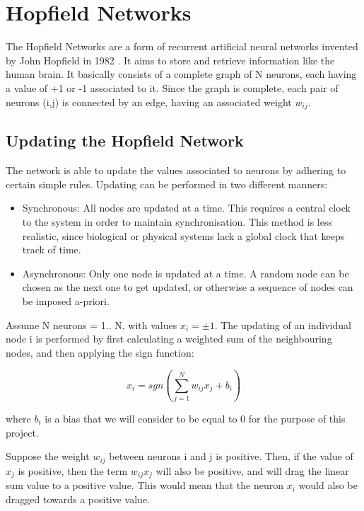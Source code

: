 \section{Hopfield Networks}

The Hopfield Networks are a form of recurrent artificial neural networks invented by John Hopfield in 1982 \cite{hopfield_wiki}. It aims to store and retrieve information like the human brain. It basically consists of a complete graph of N neurons, each having a value of +1 or -1 associated to it. Since the graph is complete, each pair of neurons (i,j) is connected by an edge, having an associated weight \( w_{ij}\).

\subsection{Updating the Hopfield Network}

The network is able to update the values associated to neurons by adhering to certain simple rules. Updating can be performed in two different manners:
\begin{itemize}
 \item Synchronous: All nodes are updated at a time. This requires a central clock to the system in order to maintain synchronisation. This method is less realistic, since biological or physical systems lack a global clock that keeps track of time.
 \item Asynchronous: Only one node is updated at a time. A random node can be chosen as the next one to get updated, or otherwise a sequence of nodes can be imposed a-priori.
\end{itemize}

Assume N neurons = 1.. N, with values \(x_{i} = \pm1\). The updating of an individual node i is performed by first calculating a weighted sum of the neighbouring nodes, and then applying the sign function:

 \[x_{i} = sgn(\sum_{j=1}^{N}w_{ij}x_{j} + b_{i})\]

where \( b_{i} \) is a bias that we will consider to be equal to 0 for the purpose of this project.

Suppose the weight \( w_{ij}\) between neurons i and j is positive. Then, if the value of \( x_{j} \) is positive, then the term \( w_{ij}x_{j} \) will also be positive, and will drag the linear sum value to a positive value. This would mean that the neuron \( x_{i} \) would also be dragged towards a positive value. 

